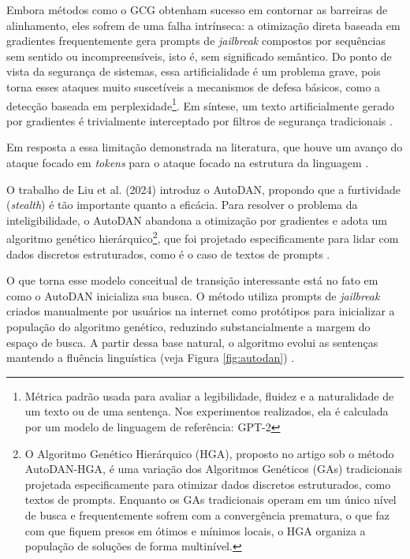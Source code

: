 Embora métodos como o GCG \cite{zou2023universaltransferableadversarialattacks} obtenham sucesso em contornar as barreiras de alinhamento, eles sofrem de uma falha intrínseca: a otimização direta baseada em gradientes frequentemente gera prompts de \textit{jailbreak} compostos por sequências sem sentido ou incompreensíveis, isto é, sem significado semântico. Do ponto de vista da segurança de sistemas, essa artificialidade é um problema grave, pois torna esses ataques muito suscetíveis a mecanismos de defesa básicos, como a detecção baseada em perplexidade\footnote{Métrica padrão usada para avaliar a legibilidade, fluidez e a naturalidade de um texto ou de uma sentença. Nos experimentos realizados, ela é calculada por um modelo de linguagem de referência: \textsc{GPT-2}}. Em síntese, um texto artificialmente gerado por gradientes é trivialmente interceptado por filtros de segurança tradicionais \cite{liu2024autodangeneratingstealthyjailbreak}.


Em resposta a essa limitação demonstrada na literatura, que houve um avanço do ataque focado em \textit{tokens} para o ataque focado na estrutura da linguagem \cite{liu2024autodangeneratingstealthyjailbreak}. 

O trabalho de Liu et al. (2024) \cite{liu2024autodangeneratingstealthyjailbreak} introduz o AutoDAN, propondo que a furtividade (\textit{stealth}) é tão importante quanto a eficácia. Para resolver o problema da inteligibilidade, o AutoDAN abandona a otimização por gradientes e adota um algoritmo genético hierárquico\footnote{O Algoritmo Genético Hierárquico (HGA), proposto no artigo sob o método AutoDAN-HGA, é uma variação dos Algoritmos Genéticos (GAs) tradicionais projetada especificamente para otimizar dados discretos estruturados, como textos de prompts. Enquanto os GAs tradicionais operam em um único nível de busca e frequentemente sofrem com a convergência prematura, o que faz com que fiquem presos em ótimos e mínimos locais, o HGA organiza a população de soluções de forma multinível.}, que foi projetado especificamente para lidar com dados discretos estruturados, como é o caso de textos de prompts \cite{liu2024autodangeneratingstealthyjailbreak}.

O que torna esse modelo conceitual de transição interessante está no fato em como o AutoDAN inicializa sua busca. O método utiliza prompts de \textit{jailbreak} criados manualmente por usuários na internet como protótipos para inicializar a população do algoritmo genético, reduzindo substancialmente a margem do espaço de busca. A partir dessa base natural, o algoritmo evolui as sentenças mantendo a fluência linguística (veja  Figura \ref{fig:autodan}) \cite{liu2024autodangeneratingstealthyjailbreak}.

